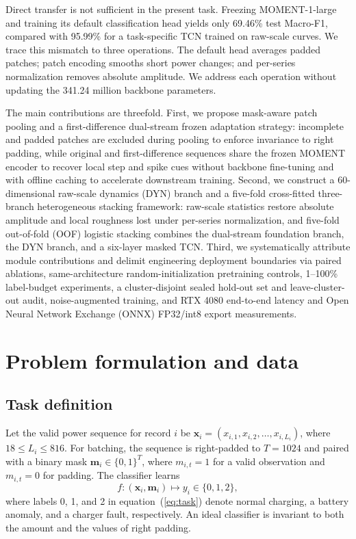 \documentclass{iopjournal}
\begin{document}
Direct transfer is not sufficient in the present task. Freezing MOMENT-1-large and training its default classification head yields only 69.46\% test Macro-F1, compared with 95.99\% for a task-specific TCN trained on raw-scale curves. We trace this mismatch to three operations. The default head averages padded patches; patch encoding smooths short power changes; and per-series normalization removes absolute amplitude. We address each operation without updating the 341.24 million backbone parameters.

The main contributions are threefold. First, we propose mask-aware patch pooling and a first-difference dual-stream frozen adaptation strategy: incomplete and padded patches are excluded during pooling to enforce invariance to right padding, while original and first-difference sequences share the frozen MOMENT encoder to recover local step and spike cues without backbone fine-tuning and with offline caching to accelerate downstream training. Second, we construct a 60-dimensional raw-scale dynamics (DYN) branch and a five-fold cross-fitted three-branch heterogeneous stacking framework: raw-scale statistics restore absolute amplitude and local roughness lost under per-series normalization, and five-fold out-of-fold (OOF) logistic stacking combines the dual-stream foundation branch, the DYN branch, and a six-layer masked TCN. Third, we systematically attribute module contributions and delimit engineering deployment boundaries via paired ablations, same-architecture random-initialization pretraining controls, 1--100\% label-budget experiments, a cluster-disjoint sealed hold-out set and leave-cluster-out audit, noise-augmented training, and RTX 4080 end-to-end latency and Open Neural Network Exchange (ONNX) FP32/int8 export measurements.

\section{Problem formulation and data}\label{sec:data}

\subsection{Task definition}

Let the valid power sequence for record $i$ be $\bm{x}_i=(x_{i,1},x_{i,2},\ldots,x_{i,L_i})$, where $18\le L_i\le 816$. For batching, the sequence is right-padded to $T=1024$ and paired with a binary mask $\bm{m}_i\in\{0,1\}^T$, where $m_{i,t}=1$ for a valid observation and $m_{i,t}=0$ for padding. The classifier learns
\begin{equation}
f:(\bm{x}_i,\bm{m}_i)\mapsto y_i\in\{0,1,2\},
\label{eq:task}
\end{equation}
where labels 0, 1, and 2 in equation~(\ref{eq:task}) denote normal charging, a battery anomaly, and a charger fault, respectively. An ideal classifier is invariant to both the amount and the values of right padding.
\end{document}
